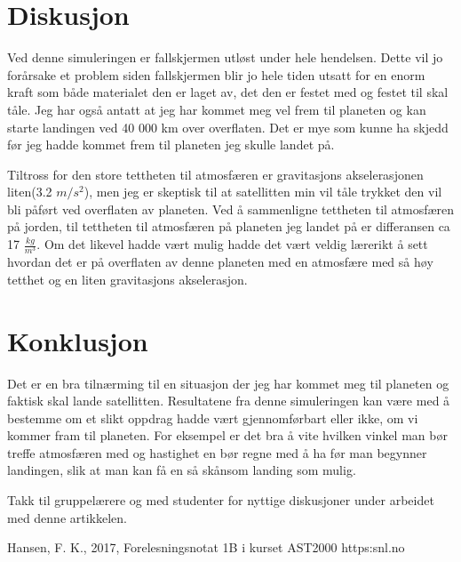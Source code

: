 \documentclass[12pt,preprint]{aastex6}
\begin{document}
\section{Diskusjon}
Ved denne simuleringen er fallskjermen utløst under hele hendelsen. Dette vil jo forårsake et problem siden fallskjermen blir jo hele tiden utsatt for en enorm kraft som både materialet den er laget av, det den er festet med og festet til skal tåle. Jeg har også antatt at jeg har kommet meg vel frem til planeten og kan starte landingen ved 40 000 km over overflaten. Det er mye som kunne ha skjedd før jeg hadde kommet frem til planeten jeg skulle landet på.

Tiltross for den store tettheten til atmosfæren er gravitasjons akselerasjonen liten(3.2 $m/s^2$), men jeg er skeptisk til at satellitten min vil tåle trykket den vil bli påført ved overflaten av planeten. Ved å sammenligne tettheten til atmosfæren på jorden, til tettheten til atmosfæren på planeten jeg landet på er differansen ca 17 $\frac{kg}{m^3}$. Om det likevel hadde vært mulig hadde det vært veldig lærerikt å sett hvordan det er på overflaten av denne planeten med en atmosfære med så høy tetthet og en liten gravitasjons akselerasjon.

\section{Konklusjon}
Det er en bra tilnærming til en situasjon der jeg har kommet meg til planeten og faktisk skal lande satellitten. Resultatene fra denne simuleringen kan være med å bestemme om et slikt oppdrag hadde vært gjennomførbart eller ikke, om vi kommer fram til planeten. For eksempel er det bra å vite hvilken vinkel man bør treffe atmosfæren med og hastighet en bør regne med å ha før man begynner landingen, slik at man kan få en så skånsom landing som mulig.




\begin{acknowledgments}
Takk til gruppelærere og med studenter for nyttige diskusjoner under arbeidet med denne artikkelen. 
\end{acknowledgments}




\begin{thebibliography}{}
 Hansen, F. K.,  2017, Forelesningsnotat 1B i kurset AST2000
https:snl.no

\end{thebibliography}
\end{document}
